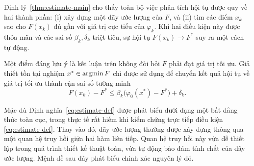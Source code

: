 \begin{essayonly}
Định lý~\ref{thm:estimate-main} cho thấy toàn bộ việc phân tích hội tụ được quy về hai thành phần: (i) xây dựng một dãy ước lượng của $F$, và (ii) tìm các điểm $x_k$ sao cho $F(x_k)$ đủ gần với giá trị cực tiểu của $\varphi_k$. Khi hai điều kiện này được thỏa mãn và các sai số $\beta_k,\delta_k$ triệt tiêu, sự hội tụ $F(x_k)\to F^*$ suy ra một cách tự động.

Một điểm đáng lưu ý là kết luận trên không đòi hỏi $F$ phải đạt giá trị tối ưu. Giả thiết tồn tại nghiệm $x^*\in\operatorname*{argmin} F$ chỉ được sử dụng để chuyển kết quả hội tụ về giá trị tối ưu thành cận sai số tường minh
\begin{equation*}
    F(x_k)-F^*
    \le
    \beta_k\bigl(\varphi_0(x^*)-F^*\bigr)+\delta_k.
\end{equation*}

Mặc dù Định nghĩa~\ref{eq:estimate-def} được phát biểu dưới dạng một bất đẳng thức toàn cục, trong thực tế rất hiếm khi kiểm chứng trực tiếp điều kiện \eqref{eq:estimate-def}. Thay vào đó, dãy ước lượng thường được xây dựng thông qua một quan hệ truy hồi giữa hai hàm liên tiếp. Quan hệ truy hồi này vừa dễ thiết lập trong quá trình thiết kế thuật toán, vừa tự động bảo đảm tính chất của dãy ước lượng. Mệnh đề sau đây phát biểu chính xác nguyên lý đó.
\end{essayonly}

